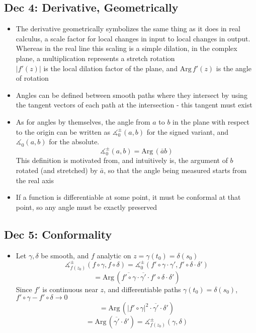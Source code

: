 \documentclass[10pt, oneside]{article}
\let\angle\measuredangle
\newcommand{\Arg}{\text{Arg} \,}
\begin{document}
\subsection{Dec 4: Derivative, Geometrically}
\begin{itemize}
    \item The derivative geometrically symbolizes the same thing as it does in real calculus, a scale factor for local changes in input to local changes in output. Whereas in the real line this scaling is a simple dilation, in the complex plane, a multiplication represents a stretch rotation\\
        $|f'(z)|$ is the local dilation factor of the plane, and $\Arg f'(z)$ is the angle of rotation
    \item Angles can be defined between smooth paths where they intersect by using the tangent vectors of each path at the intersection - this tangent must exist
    \item As for angles by themselves, the angle from $a$ to $b$ in the plane with respect to the origin can be written as $\angle ^\pm _0 (a,b)$ for the signed variant, and $\angle _0 (a,b)$ for the absolute.
        \[\angle ^\pm _0 (a,b) = \Arg(\bar{a}b)\]
        This definition is motivated from, and intuitively is, the argument of $b$ rotated (and stretched) by $\bar{a}$, so that the angle being measured starts from the real axis
    \item If a function is differentiable at some point, it must be conformal at that point, so any angle must be exactly preserved
\end{itemize}

\subsection{Dec 5: Conformality}
\begin{itemize}
    \item Let $\gamma, \delta$ be smooth, and $f$ analytic on $z = \gamma(t_0) = \delta(s_0)$
        \[\angle^\pm_{f(z_0)} (f \circ \gamma, f \circ \delta) = \angle^\pm _0 (f'\circ \gamma \cdot \gamma', f' \circ \delta \cdot \delta')\]
        \[= \Arg (\overline{f'\circ \gamma} \cdot \overline{\gamma'} \cdot f' \circ \delta \cdot \delta')\]
        Since $f'$ is continuous near $z$, and differentiable paths $\gamma(t_0) = \delta(s_0)$, $f'\circ \gamma - f' \circ \delta \rightarrow 0$
        \[= \Arg (|f'\circ \gamma|^2 \cdot \overline{\gamma'} \cdot \delta')\]
        \[= \Arg(\overline{\gamma'} \cdot \delta') = \angle^\pm_{f(z_0)} (\gamma, \delta)\]
\end{itemize}
\end{document}
